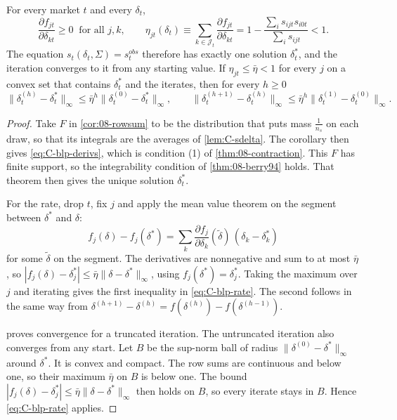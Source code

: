 \begin{proposition}\label{prop:C-blp-contraction}
For every market $t$ and every $\delta_t$,
\begin{equation}\label{eq:C-blp-derivs}
  \frac{\partial f_{jt}}{\partial\delta_{kt}} \ge 0 \ \text{ for all } j, k , \qquad
  \eta_{jt}(\delta_t) \equiv \sum_{k \in \mathcal{J}_t}\frac{\partial f_{jt}}{\partial\delta_{kt}}
  = 1 - \frac{\sum_i s_{ijt}s_{i0t}}{\sum_i s_{ijt}} < 1 .
\end{equation}
The equation $s_t(\delta_t, \Sigma) = s^{obs}_t$ therefore has exactly one solution $\delta^*_t$, and the iteration
converges to it from any starting value. If $\eta_{jt} \le \bar\eta < 1$ for every $j$ on a convex set that
contains $\delta^*_t$ and the iterates, then for every $h \ge 0$
\begin{equation}\label{eq:C-blp-rate}
  \big\|\delta^{(h)}_t - \delta^*_t\big\|_\infty \le \bar\eta^{h}\big\|\delta^{(0)}_t - \delta^*_t\big\|_\infty ,
  \qquad
  \big\|\delta^{(h+1)}_t - \delta^{(h)}_t\big\|_\infty \le \bar\eta^{h}\big\|\delta^{(1)}_t - \delta^{(0)}_t\big\|_\infty .
\end{equation}
\end{proposition}

\begin{proof}
Take $F$ in \cref{cor:08-rowsum} to be the distribution that puts mass $\frac{1}{n_s}$ on each draw, so that its
integrals are the averages of \cref{lem:C-sdelta}. The corollary then gives \eqref{eq:C-blp-derivs}, which is
condition (1) of \cref{thm:08-contraction}. This $F$ has finite support,
so the integrability condition of \cref{thm:08-berry94} holds. That theorem then gives the unique solution
$\delta^*_t$.

For the rate, drop $t$, fix $j$ and apply the mean value theorem on the segment between $\delta^*$ and $\delta$:
\[
  f_j(\delta) - f_j(\delta^*) = \sum_k\frac{\partial f_j}{\partial\delta_k}(\tilde\delta)\,(\delta_k - \delta^*_k)
\]
for some $\tilde\delta$ on the segment. The derivatives are nonnegative and sum to at most $\bar\eta$, so
$|f_j(\delta) - \delta^*_j| \le \bar\eta\|\delta - \delta^*\|_\infty$, using $f_j(\delta^*) = \delta^*_j$. Taking the
maximum over $j$ and iterating gives the first inequality in \eqref{eq:C-blp-rate}. The second follows in the same way
from $\delta^{(h+1)} - \delta^{(h)} = f(\delta^{(h)}) - f(\delta^{(h-1)})$.

 proves convergence for a truncated iteration. The untruncated iteration also converges from any
start. Let $B$ be the sup-norm ball of radius $\|\delta^{(0)} - \delta^*\|_\infty$ around $\delta^*$. It is convex and
compact. The row sums are continuous and below one, so their maximum $\bar\eta$ on $B$ is below one. The bound
$|f_j(\delta) - \delta^*_j| \le \bar\eta\|\delta - \delta^*\|_\infty$ then holds on $B$, so every iterate stays in $B$.
Hence \eqref{eq:C-blp-rate} applies.
\end{proof}

